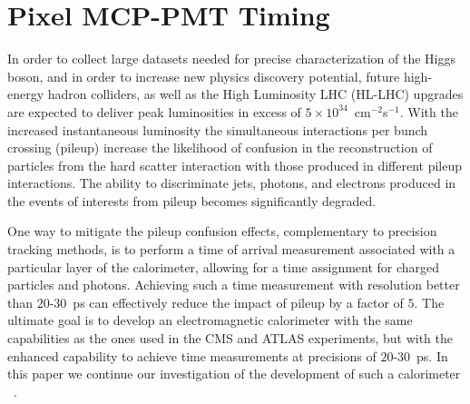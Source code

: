 \section{Pixel MCP-PMT Timing}\label{mcp-cal}
In order to collect large datasets needed for precise characterization of the
Higgs boson, and in order to increase new physics discovery potential, future
high-energy hadron colliders, as well as the High Luminosity LHC (HL-LHC)
upgrades are expected to deliver peak luminosities in excess of $5\times
10^{34}$~cm$^{-2}$s$^{-1}$. With the increased instantaneous luminosity the
simultaneous interactions per bunch crossing (pileup) increase the likelihood of
confusion in the reconstruction of particles from the hard scatter interaction
with those produced in different pileup interactions. The ability to
discriminate jets, photons, and electrons produced in the events of interests
from pileup becomes significantly degraded. 

One way to mitigate the pileup confusion effects, complementary to precision tracking 
methods, is to perform a time of arrival measurement associated with a particular layer of the
calorimeter, allowing for a time assignment for charged particles and photons.
Achieving such a time measurement with resolution better than $20$-$30$~ps
can effectively reduce the impact of pileup by a factor of $5$. The ultimate 
goal is to develop an electromagnetic calorimeter with the same capabilities as 
the ones used in the CMS and ATLAS experiments, but with the enhanced capability 
to achieve time measurements at precisions of $20$-$30$~ps.
In this paper we continue our investigation of the development of such a calorimeter
~\cite{Anderson:2015gha,MCPFastCaloNIMA,Ronzhin:2015pba,Ronzhin2015288}. 

